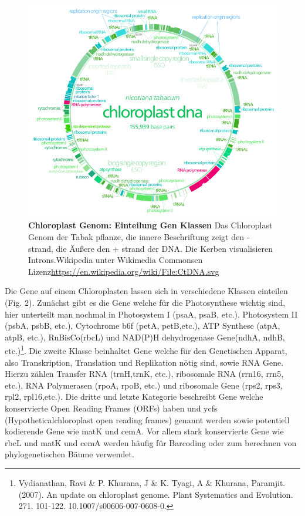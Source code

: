 \documentclass{scrartcl}
\begin{document}
\begin{figure}
\includegraphics[width=.9\linewidth]{./703px-CtDNA.png}
\caption[Chloroplast Genom: Gen Klassen]{\textbf{Chloroplast Genom: Einteilung Gen Klassen} Das Chloroplast Genom der Tabak pflanze, die innere Beschriftung zeigt den - strand, die Äußere den + strand der DNA. Die Kerben visualisieren Introns.Wikipedia unter Wikimedia Commonsen Lizenz\url{https://en.wikipedia.org/wiki/File:CtDNA.svg}}
\end{figure}
Die Gene auf einem Chloroplasten lassen sich in verschiedene Klassen einteilen (Fig. 2). Zunächst gibt es die Gene welche für die Photosynthese wichtig sind,
hier unterteilt man nochmal in Photosystem I (psaA, psaB, etc.), Photosystem II (psbA, psbB, etc.), Cytochrome b6f (petA, petB,etc.), 
ATP Synthese (atpA, atpB, etc.), RuBisCo(rbcL) und NAD(P)H dehydrogenase Gene(ndhA, ndhB, etc.)\footnote{Vydianathan, Ravi \& P. Khurana, J \& K. Tyagi, A \& Khurana, Paramjit. (2007). An update on chloroplast genome. Plant Systematics and Evolution. 271. 101-122. 10.1007/s00606-007-0608-0.}. Die zweite Klasse beinhaltet Gene welche für den
Genetischen Apparat, also Transkription, Translation und Replikation nötig sind, sowie RNA Gene. Hierzu zählen Transfer RNA (trnH,trnK, etc.), ribosomale RNA (rrn16, rrn5, etc.), 
RNA Polymerasen (rpoA, rpoB, etc.) und ribosomale Gene (rps2, rps3, rpl2, rpl16,etc.). Die dritte und letzte Kategorie beschreibt Gene welche konservierte Open Reading Frames (ORFs) haben und
ycfs (Hypotheticalchloroplast open reading frames) genannt werden sowie potentiell kodierende Gene wie matK und cemA\footnotemark[12]{}. Vor allem stark konservierte Gene wie rbcL und matK und cemA werden 
häufig für Barcoding oder zum berechnen von phylogenetischen Bäume verwendet.
\end{document}

